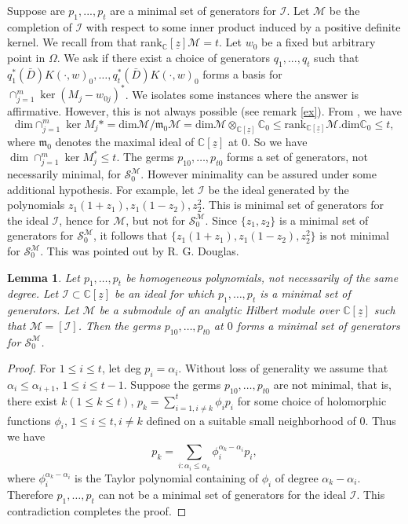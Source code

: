 \documentclass[11pt]{amsart}
\newtheorem{lem}[thm]{Lemma}
\theoremstyle{definition}
\numberwithin{equation}{section}
\begin{document}
Suppose are $p_1,...,p_t$ are a minimal set of generators for $\mathcal I$. Let $\mathcal M$ be the completion of $\mathcal I$ with respect to some inner product induced by a positive definite kernel. We recall from \cite{dp} that rank$_{{\mathbb C}}[\underline z]\mathcal
M=t$. Let $w_0$ be a fixed but arbitrary point in $\Omega$. We ask if there exist a choice of generators $q_1,...,q_t$ such that $q^*_1(\bar D)K(\cdot,w)_{0},\ldots, q^*_t(\bar D)K(\cdot,w)_{0}$ forms a basis for $\cap_{j=1}^m\ker (M_j -w_{0j}) ^*$. We isolates some instances where the answer is affirmative. However, this is not always possible (see remark \ref{ex}). From \cite[Lemma 5.11, Page-89]{dp}, we have
$$
\mbox{dim}\cap_{j=1}^m\ker M_j*=\mbox{dim}\mathcal M/\mathfrak m_0\mathcal
M=\mbox{dim}\mathcal M\otimes_{{{\mathbb C}}[\underline z]}{{\mathbb C}}_0\leq \mbox{rank}_{{{\mathbb C}}[\underline z]}\mathcal M.\mbox{dim}{{\mathbb C}}_0\leq t,
$$
where $\mathfrak m_0$ denotes the maximal ideal of ${{\mathbb C}}[\underline z]$ at $0$.  So we have $\dim \cap_{j=1}^m\ker M^*_j\leq t$. The germs $p_{10},\ldots, p_{t0}$ forms a set of generators, not necessarily minimal, for ${\mathcal S}^{\mathcal
M}_0$. However minimality can be assured under some additional hypothesis.  For example, let $\mathcal I$ be the ideal  generated by the polynomials $z_1(1+z_1), z_1(1 - z_2), z_2^2$. This is minimal set of generators for the ideal $\mathcal I$, hence for $\mathcal M$, but not for ${\mathcal S}^{\mathcal M}_0$. Since $\{z_1,z_2\}$ is a minimal set of generators for ${\mathcal S}^{\mathcal
M}_0$, it follows that $\{z_1(1+z_1), z_1(1 - z_2), z_2^2\}$ is not minimal for ${\mathcal S}^{\mathcal
M}_0$. This was pointed out by R. G. Douglas.

\begin{lem}\label{jl}
Let $p_1,\ldots,p_t$ be homogeneous polynomials, not necessarily of the same degree. Let $\mathcal I\subset {{\mathbb C}}[\underline z]$ be an ideal for which $p_1,\ldots,p_t$ is a minimal set of generators. Let $\mathcal M$ be a submodule of an analytic Hilbert module over ${{\mathbb C}}[\underline z]$ such that $\mathcal M = [\mathcal I]$. Then the germs $p_{10},\ldots, p_{t0}$ at $0$ forms a minimal set of generators for ${\mathcal S}^{\mathcal M}_0$.
\end{lem}
\begin{proof}
For $1\leq i\leq t$, let deg $p_i = \alpha_i$. Without loss of generality we assume that $\alpha_i\leq \alpha_{i+1} ,\, 1\leq i\leq t-1$. Suppose the germs $p_{10},\ldots, p_{t0}$ are not minimal, that is, there exist $k ( 1\leq k\leq t)$, $p_k=\sum_{i=1,i\neq k}^t\phi_ip_i$ for some choice of holomorphic functions $\phi_i,\,1\leq i\leq t, i\neq k$ defined on a suitable small neighborhood of $0$. Thus we have
$$
p_k = \sum_{i:\alpha_i\leq \alpha_k}\phi_i^{\alpha_k-\alpha_i}p_i,
$$
where $\phi_i^{\alpha_k-\alpha_i}$ is the Taylor polynomial containing  of $\phi_i$ of degree  $\alpha_k-\alpha_i$. Therefore $p_1,\ldots,p_t$ can not be a minimal set of generators for the ideal $\mathcal I$. This contradiction completes the proof.
\end{proof}
\end{document}
